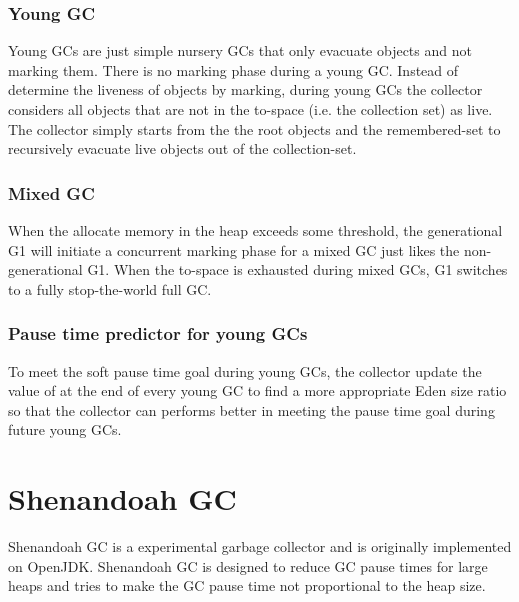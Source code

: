 \begin{figure*}
  \centering
  \texttt{[image: \{figs/generational.png]}}
  \caption{Generational G1 Heap Allocation}
  \label{fig:generationalg1}
\end{figure*}

\subsubsection{Young GC}

Young GCs are just simple nursery GCs that only evacuate objects and not marking them.
There is no marking phase during a young GC. Instead of determine the liveness of objects
by marking, during young GCs the collector considers all objects that are not in the
to-space (i.e. the collection set) as live. The collector simply starts from the the root
objects and the remembered-set to recursively evacuate live objects out of the collection-set.

\subsubsection{Mixed GC}

When the allocate memory in the heap exceeds some threshold, the generational G1 will
initiate a concurrent marking phase for a mixed GC just likes the non-generational G1.
When the to-space is exhausted during mixed GCs, G1 switches to a fully stop-the-world full GC.

\subsubsection{Pause time predictor for young GCs}

To meet the soft pause time goal during young GCs, the collector update the value of 
at the end of every young GC to find a more appropriate Eden size ratio so that
the collector can performs better in meeting the pause time goal during future young GCs.
 
\section{Shenandoah GC}
\label{sec:shenandoahgc}

Shenandoah GC is a experimental garbage collector and is originally implemented on OpenJDK.
Shenandoah GC is designed to reduce GC pause times for large heaps and tries to make the GC pause
time not proportional to the heap size.
 
